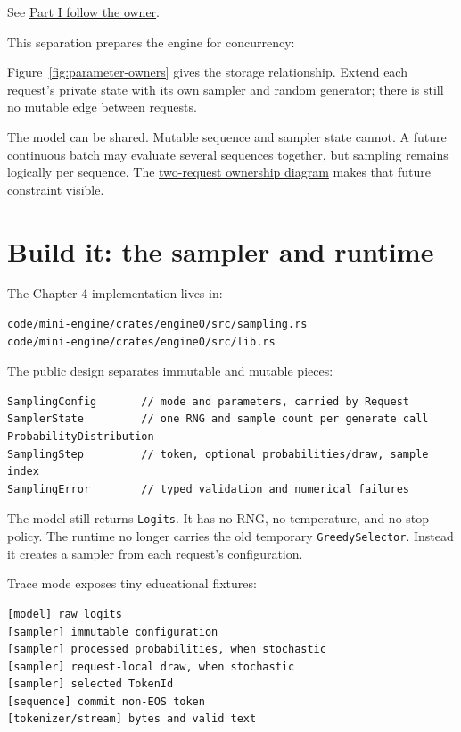 See
\href{https://github.com/hermonai/inside-the-llm-engine/blob/astra-visual-rewrite/diagrams/sampling/part1-follow-owner.txt}{Part
I follow the owner}.

This separation prepares the engine for concurrency:

Figure~\ref{fig:parameter-owners} gives the storage relationship. Extend
each request's private state with its own sampler and random generator;
there is still no mutable edge between requests.

The model can be shared. Mutable sequence and sampler state cannot. A
future continuous batch may evaluate several sequences together, but
sampling remains logically per sequence. The
\href{https://github.com/hermonai/inside-the-llm-engine/blob/astra-visual-rewrite/diagrams/sampling/model-two-requests.txt}{two-request
ownership diagram} makes that future constraint visible.

\section{Build it: the sampler and
runtime}\label{build-it-the-sampler-and-runtime}

The Chapter 4 implementation lives in:

\begin{verbatim}
code/mini-engine/crates/engine0/src/sampling.rs
code/mini-engine/crates/engine0/src/lib.rs
\end{verbatim}

The public design separates immutable and mutable pieces:

\begin{verbatim}
SamplingConfig       // mode and parameters, carried by Request
SamplerState         // one RNG and sample count per generate call
ProbabilityDistribution
SamplingStep         // token, optional probabilities/draw, sample index
SamplingError        // typed validation and numerical failures
\end{verbatim}

The model still returns \texttt{Logits}. It has no RNG, no temperature,
and no stop policy. The runtime no longer carries the old temporary
\texttt{GreedySelector}. Instead it creates a sampler from each
request's configuration.

Trace mode exposes tiny educational fixtures:

\begin{verbatim}
[model] raw logits
[sampler] immutable configuration
[sampler] processed probabilities, when stochastic
[sampler] request-local draw, when stochastic
[sampler] selected TokenId
[sequence] commit non-EOS token
[tokenizer/stream] bytes and valid text
\end{verbatim}

